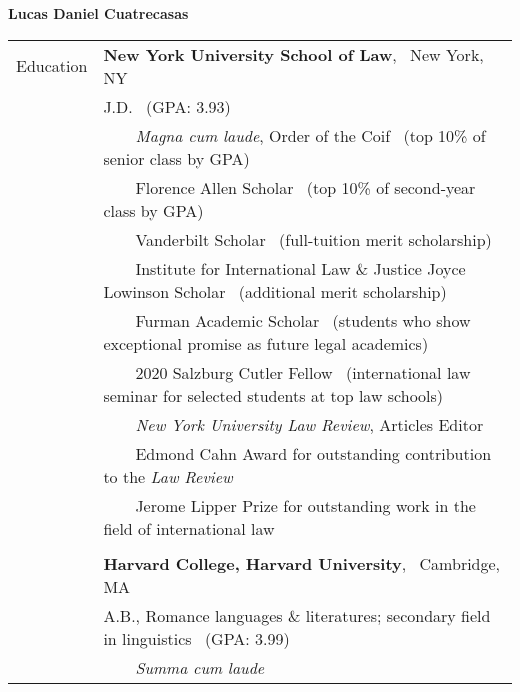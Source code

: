 \documentclass[a4paper,11pt,oneside]{article}
\newcommand{\years}[1]{\marginnote{\scriptsize #1}}
\newcommand{\tabitem}{~~\llap{\footnotesize{\textbullet}}~~}
\newcommand{\raum}{\vspace{1.5ex}}
\begin{document}
\thispagestyle{empty}

\noindent \LARGE{\textbf{Lucas Daniel Cuatrecasas}} \\
\noindent\makebox[\textwidth][l]{\rule{1.15\textwidth}{0.075ex}}
\noindent \footnotesize
{}

\vspace{5ex}

\noindent \begin{tabular}{@{} l l}
\years{2021} \large{Education} & \small{\textbf{New York University School of Law}}, \ New York, NY \\
     & J.D. \ (GPA: 3.93) \raum \\
     & \tabitem \textit{Magna cum laude}, Order of the Coif \ (top 10\% of senior class by GPA) \\
     & \tabitem Florence Allen Scholar \ (top 10\% of second-year class by GPA) \\
     & \tabitem Vanderbilt Scholar \ (full-tuition merit scholarship) \\
     & \tabitem Institute for International Law \& Justice Joyce Lowinson Scholar \ (additional merit scholarship) \\
     & \tabitem Furman Academic Scholar \ (students who show exceptional promise as future legal academics) \\
     & \tabitem 2020 Salzburg Cutler Fellow \ (international law seminar for selected students at top law schools) \\
     & \tabitem \textit{New York University Law Review}, Articles Editor \\
     & \tabitem Edmond Cahn Award for outstanding contribution to the \textit{Law Review} \\
     & \tabitem Jerome Lipper Prize for outstanding work in the field of international law \\
     & \\
\years{2018} & \small{\textbf{Harvard College, Harvard University}}, \ Cambridge, MA \\
     & A.B., Romance languages \& literatures; secondary field in linguistics \ (GPA: 3.99) \raum \\
     & \tabitem \textit{Summa cum laude} \\

\end{tabular}
\end{document}
